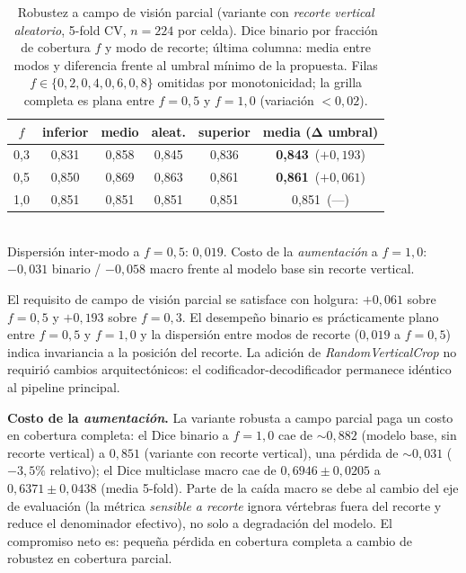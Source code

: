 \documentclass[conference]{IEEEtran}
\begin{document}
\begin{table}[htbp]
\caption{Robustez a campo de visión parcial (variante con \emph{recorte vertical aleatorio}, 5-fold CV, $n=224$ por celda). Dice binario por fracción de cobertura $f$ y modo de recorte; última columna: media entre modos y diferencia frente al umbral mínimo de la propuesta. Filas $f \in \{0{,}2, 0{,}4, 0{,}6, 0{,}8\}$ omitidas por monotonicidad; la grilla completa es plana entre $f=0{,}5$ y $f=1{,}0$ (variación $< 0{,}02$).}
\label{tab:partial-fov}
\begin{center}
\renewcommand{\arraystretch}{1.15}
\footnotesize
\begin{tabular}{@{}cccccc@{}}
\toprule
\textbf{$f$} & \textbf{inferior} & \textbf{medio} & \textbf{aleat.} & \textbf{superior} & \textbf{media (Δ umbral)} \\
\midrule
0{,}3 & 0{,}831 & 0{,}858 & 0{,}845 & 0{,}836 & \textbf{0{,}843} \,($+0{,}193$) \\
0{,}5 & 0{,}850 & 0{,}869 & 0{,}863 & 0{,}861 & \textbf{0{,}861} \,($+0{,}061$) \\
1{,}0 & 0{,}851 & 0{,}851 & 0{,}851 & 0{,}851 & 0{,}851 \,(---) \\
\bottomrule
\end{tabular}\\[2pt]
{\scriptsize Dispersión inter-modo a $f=0{,}5$: $0{,}019$. Costo de la \emph{aumentación} a $f=1{,}0$: $-0{,}031$ binario / $-0{,}058$ macro frente al modelo base sin recorte vertical.}
\end{center}
\end{table}

El requisito de campo de visión parcial se satisface con holgura: $+0{,}061$ sobre $f=0{,}5$ y $+0{,}193$ sobre $f=0{,}3$. El desempeño binario es prácticamente plano entre $f=0{,}5$ y $f=1{,}0$ y la dispersión entre modos de recorte ($0{,}019$ a $f=0{,}5$) indica invariancia a la posición del recorte. La adición de \emph{RandomVerticalCrop} no requirió cambios arquitectónicos: el codificador-decodificador permanece idéntico al pipeline principal.

\textbf{Costo de la \emph{aumentación}.} La variante robusta a campo parcial paga un costo en cobertura completa: el Dice binario a $f=1{,}0$ cae de $\sim 0{,}882$ (modelo base, sin recorte vertical) a $0{,}851$ (variante con recorte vertical), una pérdida de $\sim 0{,}031$ ($-3{,}5\%$ relativo); el Dice multiclase macro cae de $0{,}6946 \pm 0{,}0205$ a $0{,}6371 \pm 0{,}0438$ (media 5-fold). Parte de la caída macro se debe al cambio del eje de evaluación (la métrica \emph{sensible a recorte} ignora vértebras fuera del recorte y reduce el denominador efectivo), no solo a degradación del modelo. El compromiso neto es: pequeña pérdida en cobertura completa a cambio de robustez en cobertura parcial.
\end{document}
